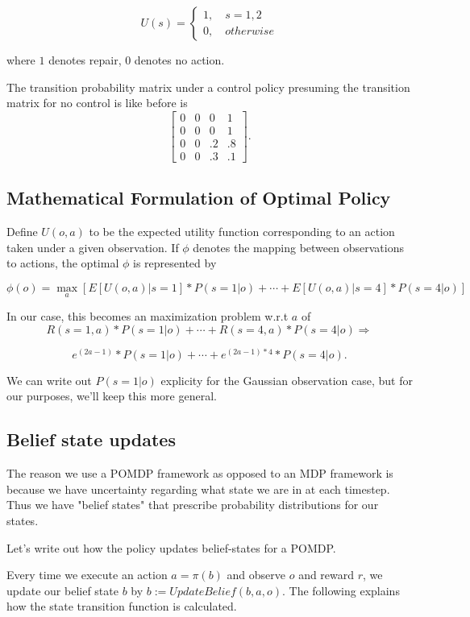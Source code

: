 \documentclass[english]{article}
\numberwithin{equation}{section}
\begin{document}
$$
U(s) = \begin{cases}
1, \quad s=1,2 \\
0, \quad otherwise
\end{cases}
$$

where $1$ denotes repair, $0$ denotes no action.

The transition probability matrix under a control policy presuming the transition matrix for no control is like before is
$$
\begin{bmatrix}
0 & 0 & 0 & 1 \\
0 & 0 & 0 & 1 \\
0 & 0 & .2 & .8 \\
0 & 0 & .3 & .1
\end{bmatrix}.
$$

\subsection{Mathematical Formulation of Optimal Policy}
Define $U(o,a)$ to be the expected utility function corresponding to an action taken under a given observation. If $\phi$ denotes the mapping between observations to actions, the optimal $\phi$ is represented by

$$\phi(o) = \max_a \left[ E[U(o,a)|s=1]*P(s=1|o)+\cdots + E[U(o,a)|s=4]*P(s=4|o)
\right] $$

In our case, this becomes an maximization problem w.r.t $a$ of
$$R(s=1,a)*P(s=1|o)+\cdots+R(s=4,a)*P(s=4|o) \Rightarrow$$

$$e^{(2a-1)}*P(s=1|o) + \cdots + e^{(2a-1)*4}*P(s=4|o).$$

We can write out $P(s=1|o)$ explicity for the Gaussian observation case, but for our purposes, we'll keep this more general.


\subsection{Belief state updates}
The reason we use a POMDP framework as opposed to an MDP framework is because we have uncertainty regarding what state we are in at each timestep. Thus we have "belief states" that prescribe probability distributions for our states.

Let's write out how the policy updates belief-states for a POMDP.

Every time we execute an action $a=\pi(b)$ and observe $o$ and reward $r$, we update our belief state $b$ by $b := UpdateBelief(b,a,o)$. The following explains how the state transition function is calculated.
\end{document}
